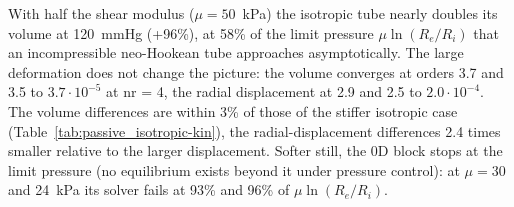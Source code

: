 With half the shear modulus ($\mu = 50$~kPa) the isotropic tube nearly doubles its volume
at 120~mmHg (+96\%), at 58\% of the limit pressure $\mu\ln(R_e/R_i)$ that an
incompressible neo-Hookean tube approaches asymptotically. The large deformation does not
change the picture: the volume converges at orders 3.7 and 3.5 to $3.7\cdot10^{-5}$ at
nr = 4, the radial displacement at 2.9 and 2.5 to $2.0\cdot10^{-4}$. The volume differences
are within 3\% of those of the stiffer isotropic case (Table~\ref{tab:passive_isotropic-kin}),
the radial-displacement differences 2.4 times smaller relative to the larger displacement. Softer still, the 0D
block stops at the limit pressure (no equilibrium exists beyond it under pressure
control): at $\mu = 30$ and 24~kPa its solver fails at 93\% and 96\% of $\mu\ln(R_e/R_i)$.
